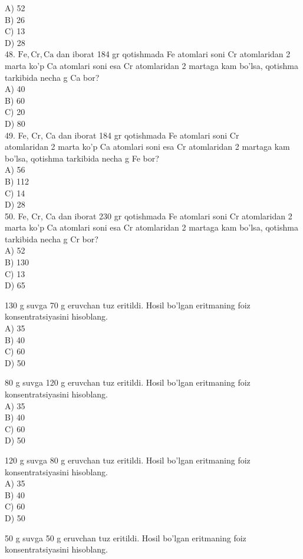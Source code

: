 A) 52\\
B) 26\\
C) 13\\
D) 28\\
48. $\mathrm{Fe}, \mathrm{Cr}, \mathrm{Ca}$ dan iborat 184 gr qotishmada Fe atomlari soni Cr atomlaridan 2 marta ko'p Ca atomlari soni esa Cr atomlaridan 2 martaga kam bo'lsa, qotishma tarkibida necha g Ca bor?\\
A) 40\\
B) 60\\
C) 20\\
D) 80\\
49. Fe, Cr, Ca dan iborat 184 gr qotishmada Fe atomlari soni Cr\\
atomlaridan 2 marta ko'p Ca atomlari soni esa Cr atomlaridan 2 martaga kam bo'lsa, qotishma tarkibida necha g Fe bor?\\
A) 56\\
B) 112\\
C) 14\\
D) 28\\
50. Fe, Cr, Ca dan iborat 230 gr qotishmada Fe atomlari soni Cr atomlaridan 2 marta ko'p Ca atomlari soni esa Cr atomlaridan 2 martaga kam bo'lsa, qotishma tarkibida necha g Cr bor?\\
A) 52\\
B) 130\\
C) 13\\
D) 65
  \item 130 g suvga 70 g eruvchan tuz eritildi. Hosil bo'lgan eritmaning foiz konsentratsiyasini hisoblang.\\
A) 35\\
B) 40\\
C) 60\\
D) 50\\
  \item 80 g suvga 120 g eruvchan tuz eritildi. Hosil bo'lgan eritmaning foiz konsentratsiyasini hisoblang.\\
A) 35\\
B) 40\\
C) 60\\
D) 50
  \item 120 g suvga 80 g eruvchan tuz eritildi. Hosil bo'lgan eritmaning foiz konsentratsiyasini hisoblang.\\
A) 35\\
B) 40\\
C) 60\\
D) 50
  \item 50 g suvga 50 g eruvchan tuz eritildi. Hosil bo'lgan eritmaning foiz konsentratsiyasini hisoblang.\\
